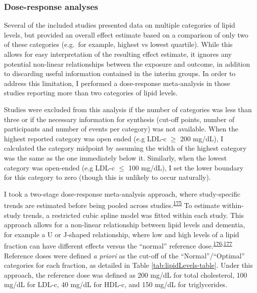 \documentclass[a4paper, twoside]{templates/ociamthesis}
\begin{document}
\hypertarget{dose-response-analyses}{%
\subsubsection{Dose-response analyses}\label{dose-response-analyses}}

Several of the included studies presented data on multiple categories of lipid levels, but provided an overall effect estimate based on a comparison of only two of these categories (e.g.~for example, highest vs lowest quartile). While this allows for easy interpretation of the resulting effect estimate, it ignores any potential non-linear relationships between the exposure and outcome, in addition to discarding useful information contained in the interim groups. In order to address this limitation, I performed a dose-response meta-analysis in those studies reporting more than two categories of lipid levels.

Studies were excluded from this analysis if the number of categories was less than three or if the necessary information for synthesis (cut-off points, number of participants and number of events per category) was not available. When the highest reported category was open ended (e.g LDL-c \(\geqslant\) 200 mg/dL), I calculated the category midpoint by assuming the width of the highest category was the same as the one immediately below it. Similarly, when the lowest category was open-ended (e.g LDL-c \(\leqslant\) 100 mg/dL), I set the lower boundary for this category to zero (though this is unlikely to occur naturally).

I took a two-stage dose-response meta-analysis approach, where study-specific trends are estimated before being pooled across studies.\textsuperscript{\protect\hyperlink{ref-greenland1992}{175}} To estimate within-study trends, a restricted cubic spline model was fitted within each study. This approach allows for a non-linear relationship between lipid levels and dementia, for example a U or J-shaped relationship, where low and high levels of a lipid fraction can have different effects versus the ``normal'' reference dose.\textsuperscript{\protect\hyperlink{ref-durrleman1989}{176},\protect\hyperlink{ref-liu2009}{177}} Reference doses were defined \emph{a priori} as the cut-off of the ``Normal''/``Optimal'' categories for each fraction, as detailed in Table \ref{tab:lipidLevels-table}. Under this approach, the reference dose was defined as 200 mg/dL for total cholesterol, 100 mg/dL for LDL-c, 40 mg/dL for HDL-c, and 150 mg/dL for triglycerides.
\end{document}
